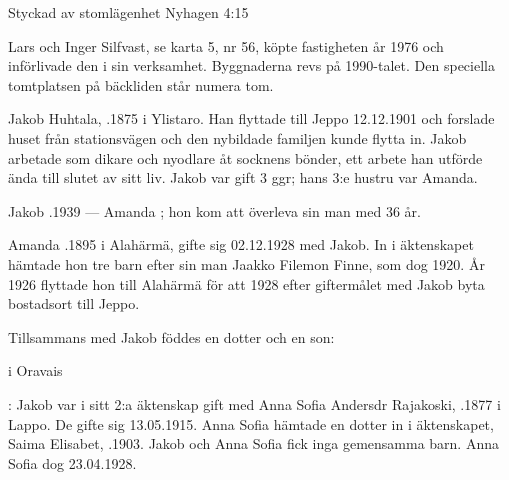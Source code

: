 %

Styckad av stomlägenhet Nyhagen 4:15

%
Lars och Inger Silfvast, se karta 5, nr 56, köpte fastigheten år 1976 och införlivade den i sin verksamhet. Byggnaderna revs på 1990-talet. Den speciella tomtplatsen på bäckliden står numera tom.



%
Jakob Huhtala, .1875 i Ylistaro. Han flyttade till Jeppo 12.12.1901 och forslade huset från stationsvägen och den nybildade familjen kunde flytta in. Jakob  arbetade som dikare och nyodlare åt socknens bönder, ett arbete han utförde ända till slutet av sitt liv. Jakob var gift 3 ggr; hans 3:e hustru var Amanda.

Jakob .1939  ---  Amanda ; hon kom att överleva sin man med 36 år.

Amanda .1895 i Alahärmä, gifte sig 02.12.1928 med Jakob. In i äktenskapet hämtade hon tre barn efter sin man Jaakko Filemon Finne, som dog 1920. År 1926 flyttade hon till Alahärmä för att 1928 efter giftermålet med Jakob byta bostadsort till Jeppo.
\begin{jhchildren}
  \item {}
  \item {}
  \item {}
\end{jhchildren}
Tillsammans med Jakob föddes en dotter och en son:
  \begin{jhchildren}
    \item {} i Oravais
    \item {}
\end{jhchildren}


:
Jakob var i sitt 2:a äktenskap gift  med Anna Sofia Andersdr Rajakoski, .1877 i Lappo. De gifte sig 13.05.1915. Anna Sofia hämtade en dotter in i äktenskapet, Saima Elisabet, .1903. Jakob och Anna Sofia fick inga gemensamma barn. Anna Sofia dog 23.04.1928.

